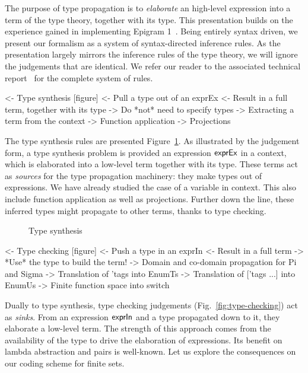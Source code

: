 
The purpose of type propagation is to \emph{elaborate} an high-level
expression into a term of the type theory, together with its
type. This presentation builds on the experience gained in
implementing Epigram 1~\cite{mcbride:view-from-the-left}. Being
entirely syntax driven, we present our formalism as a system of
syntax-directed inference rules. As the presentation largely mirrors
the inference rules of the type theory, we will ignore the judgements
that are identical. We refer our reader to the associated technical
report~\cite{chapman:desc-tech-report} for the complete system of
rules.

\begin{wstructure}
<- Type synthesis [figure]
    <- Pull a type out of an exprEx
    <- Result in a full term, together with its type
    -> Do *not* need to specify types
        -> Extracting a term from the context
        -> Function application
        -> Projections
\end{wstructure}

The type synthesis rules are presented
Figure~\ref{fig:type-synthesis}. As illustrated by the judgement form,
a type synthesis problem is provided an expression $\textsf{exprEx}$ in a
context, which is elaborated into a low-level term together with its
type. These terms act as \emph{sources} for the type propagation
machinery: they make types out of expressions. We have already studied
the case of a variable in context. This also include function
application as well as projections. Further down the line, these
inferred types might propagate to other terms, thanks to type
checking.

\begin{figure}

\caption{Type synthesis}
\label{fig:type-synthesis}
\end{figure}



\begin{wstructure}
<- Type checking [figure]
    <- Push a type in an exprIn
    <- Result in a full term
    -> *Use* the type to build the term!
        -> Domain and co-domain propagation for Pi and Sigma
        -> Translation of 'tags into EnumTs
        -> Translation of ['tags ...] into EnumUs
        -> Finite function space into switch
\end{wstructure}

Dually to type synthesis, type checking judgements
(Fig.~\ref{fig:type-checking}) act as \emph{sinks}. From an expression
$\textsf{exprIn}$ and a type propagated down to it, they elaborate a low-level
term. The strength of this approach comes from the availability of the
type to drive the elaboration of expressions. Its benefit on lambda
abstraction and pairs is well-known. Let us explore the consequences
on our coding scheme for finite sets.

